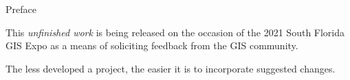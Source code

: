 \documentclass{letter}
\begin{document}
\begin{center}
Preface
\end{center}
This \emph{unfinished work} is being released on the occasion
of the 2021 South Florida GIS Expo as a means of soliciting
feedback from the GIS community.

The less developed a project, the easier it is to incorporate
suggested changes.
\end{document}
